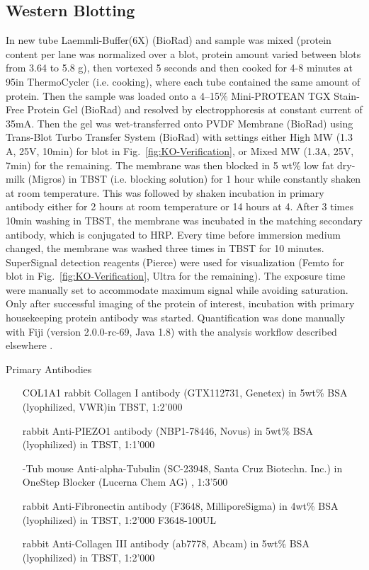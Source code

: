 \subsection{Western Blotting}
In new tube Laemmli-Buffer(6X) (BioRad) and sample was mixed (protein content per lane was normalized over a blot, protein amount varied between blots from 3.64 to 5.8 \textmu{}g), then  vortexed 5 seconds and then cooked for 4-8 minutes at 95\degC in ThermoCycler (i.e. cooking), where each tube contained the same amount of protein. Then the sample was loaded onto a 4–15\% Mini-PROTEAN TGX Stain-Free Protein Gel (BioRad) and resolved by electropphoresis at constant current of 35mA. Then the gel was wet-transferred onto PVDF Membrane (BioRad) using Trans-Blot Turbo Transfer System (BioRad) with settings either High MW (1.3 A, 25V, 10min) for blot in Fig.~\vref{fig:KO-Verification}, or Mixed MW (1.3A, 25V, 7min) for the remaining. The membrane was then blocked in 5 wt\% low fat dry-milk (Migros) in TBST (i.e. blocking solution) for 1 hour while constantly shaken at room temperature. This was followed by shaken incubation in primary antibody either for 2 hours at room temperature or 14 hours at 4\degC{}. After 3 times 10min washing in TBST, the membrane was incubated in the matching secondary antibody, which is conjugated to HRP. Every time before immersion medium changed, the membrane was washed three times in TBST for 10 minutes. SuperSignal detection reagents (Pierce) were used for visualization (Femto for blot in Fig.~\vref{fig:KO-Verification}, Ultra for the remaining). The exposure time were manually set to accommodate maximum signal while avoiding saturation. Only after successful imaging of the protein of interest, incubation with primary housekeeping protein antibody was started. Quantification was done manually with Fiji (version 2.0.0-rc-69, Java 1.8) with the analysis workflow described elsewhere \cite{Miller2010}.




Primary Antibodies
    \begin{itemize}
		\item[COL1A1] rabbit Collagen I antibody (GTX112731, Genetex) in 5wt\% BSA (lyophilized, VWR)in TBST, 1:2'000
		\item[\PiezoGene{}] rabbit Anti-PIEZO1 antibody (NBP1-78446, Novus) in 5wt\% BSA (lyophilized) in TBST, 1:1'000
		\item[\textalpha{}-Tub] mouse Anti-alpha-Tubulin (SC-23948, Santa Cruz Biotechn. Inc.) in OneStep Blocker (Lucerna Chem AG) , 1:3'500
		\item[\FnGene{}] rabbit Anti-Fibronectin antibody (F3648, MilliporeSigma) in 4wt\% BSA (lyophilized) in TBST, 1:2'000 F3648-100UL
		\item[\colthreeGene{}] rabbit Anti-Collagen III antibody (ab7778, Abcam) in 5wt\% BSA (lyophilized) in TBST, 1:2'000
    \end{itemize}

